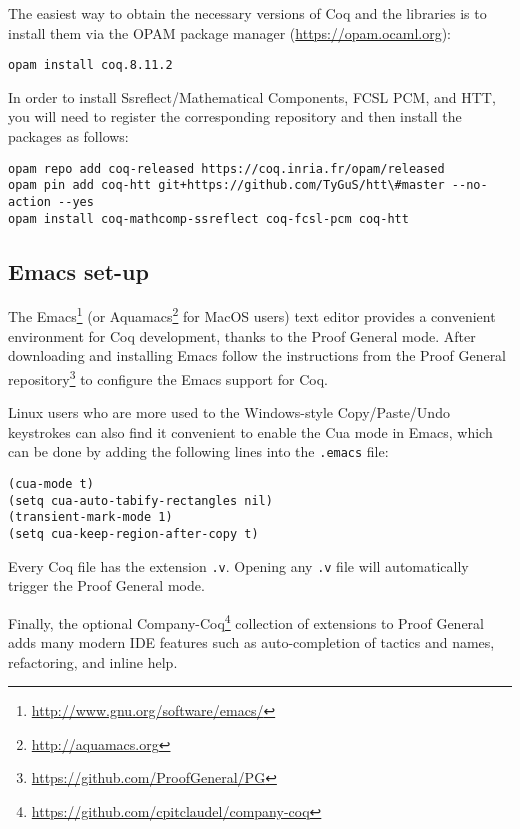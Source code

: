 The easiest way to obtain the necessary versions of Coq and the libraries is
to install them via the OPAM package manager (\url{https://opam.ocaml.org}):


\begin{verbatim}
opam install coq.8.11.2
\end{verbatim}


In order to install Ssreflect/Mathematical Components, FCSL PCM, and HTT,
you will need to register the corresponding
repository and then install the packages as follows:


\begin{verbatim}
opam repo add coq-released https://coq.inria.fr/opam/released
opam pin add coq-htt git+https://github.com/TyGuS/htt\#master --no-action --yes
opam install coq-mathcomp-ssreflect coq-fcsl-pcm coq-htt
\end{verbatim}


\subsection{Emacs set-up}




The Emacs\footnote{\url{http://www.gnu.org/software/emacs/}} (or Aquamacs\footnote{\url{http://aquamacs.org}} for MacOS users) text editor provides a convenient environment for Coq development, thanks to the Proof General mode. After downloading and installing Emacs follow the instructions from the Proof General repository\footnote{\url{https://github.com/ProofGeneral/PG}} to configure the Emacs support for Coq.


Linux users who are more used to the Windows-style Copy/Paste/Undo keystrokes can also find it convenient to enable the Cua mode in Emacs, which can be done by adding the following lines into the \texttt{.emacs} file:


\begin{verbatim}
(cua-mode t) 
(setq cua-auto-tabify-rectangles nil) 
(transient-mark-mode 1) 
(setq cua-keep-region-after-copy t) 
\end{verbatim}


Every Coq file has the extension \texttt{.v}. Opening any \texttt{.v} file will automatically trigger the Proof General mode.


Finally, the optional Company-Coq\footnote{\url{https://github.com/cpitclaudel/company-coq}} collection of extensions to Proof General adds many modern IDE features such as auto-completion of tactics and names, refactoring, and inline help.


